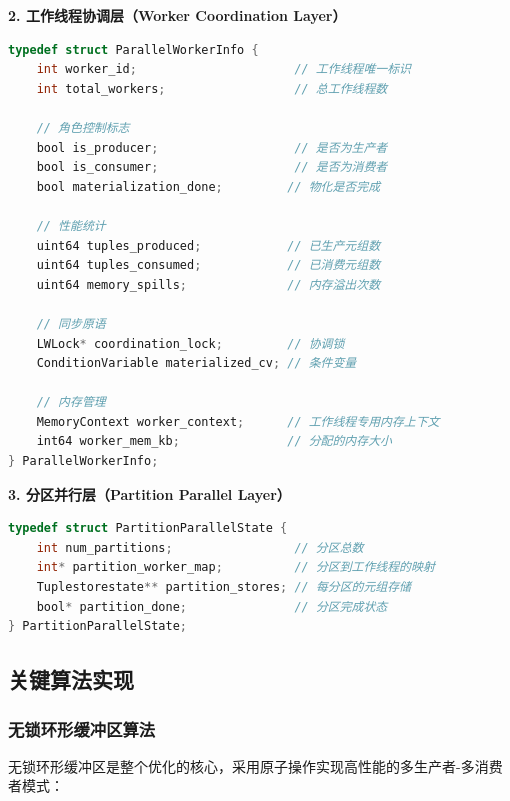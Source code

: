 \textbf{2. 工作线程协调层（Worker Coordination Layer）}
\begin{lstlisting}[language=C, caption=工作线程信息结构]
typedef struct ParallelWorkerInfo {
    int worker_id;                      // 工作线程唯一标识
    int total_workers;                  // 总工作线程数
    
    // 角色控制标志
    bool is_producer;                   // 是否为生产者
    bool is_consumer;                   // 是否为消费者
    bool materialization_done;         // 物化是否完成
    
    // 性能统计
    uint64 tuples_produced;            // 已生产元组数
    uint64 tuples_consumed;            // 已消费元组数
    uint64 memory_spills;              // 内存溢出次数
    
    // 同步原语
    LWLock* coordination_lock;         // 协调锁
    ConditionVariable materialized_cv; // 条件变量
    
    // 内存管理
    MemoryContext worker_context;      // 工作线程专用内存上下文
    int64 worker_mem_kb;               // 分配的内存大小
} ParallelWorkerInfo;
\end{lstlisting}

\textbf{3. 分区并行层（Partition Parallel Layer）}
\begin{lstlisting}[language=C, caption=分区并行状态结构]
typedef struct PartitionParallelState {
    int num_partitions;                 // 分区总数
    int* partition_worker_map;          // 分区到工作线程的映射
    Tuplestorestate** partition_stores; // 每分区的元组存储
    bool* partition_done;               // 分区完成状态
} PartitionParallelState;
\end{lstlisting}

\subsection{关键算法实现}

\subsubsection{无锁环形缓冲区算法}

无锁环形缓冲区是整个优化的核心，采用原子操作实现高性能的多生产者-多消费者模式：

